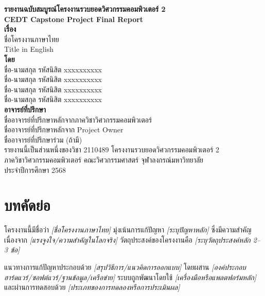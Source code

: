 \documentclass[12pt]{article}
\begin{document}
\begin{center}
    {\Large\bfseries รายงานฉบับสมบูรณ์โครงงานรวบยอดวิศวกรรมคอมพิวเตอร์ 2}\\[0.5pc]
    {\Large\bfseries CEDT Capstone Project Final Report}\\[2pc]
    
    {\large\bfseries เรื่อง}\\[0.5pc]
    {\large ชื่อโครงงานภาษาไทย} \\[0.3pc]
    {\large Title in English} \\[2pc]
    
    {\large\bfseries โดย}\\[0.5pc]
    ชื่อ-นามสกุล รหัสนิสิต xxxxxxxxxx\\
    ชื่อ-นามสกุล รหัสนิสิต xxxxxxxxxx\\
    ชื่อ-นามสกุล รหัสนิสิต xxxxxxxxxx\\
    ชื่อ-นามสกุล รหัสนิสิต xxxxxxxxxx\\[2pc]
    
    {\large\bfseries อาจารย์ที่ปรึกษา}\\[0.5pc]
    ชื่ออาจารย์ที่ปรึกษาหลักจากภาควิชาวิศวกรรมคอมพิวเตอร์\\
    ชื่ออาจารย์ที่ปรึกษาหลักจาก Project Owner\\
    ชื่ออาจารย์ที่ปรึกษาร่วม (ถ้ามี)\\[2pc]
    
    รายงานนี้เป็นส่วนหนึ่งของวิชา 2110489 โครงงานรวบยอดวิศวกรรมคอมพิวเตอร์ 2\\
    ภาควิชาวิศวกรรมคอมพิวเตอร์ คณะวิศวกรรมศาสตร์ จุฬาลงกรณ์มหาวิทยาลัย\\
    ประจำปีการศึกษา 2568
\end{center}

\newpage

\section*{บทคัดย่อ}
โครงงานนี้มีชื่อว่า \textit{[ชื่อโครงงานภาษาไทย]} มุ่งเน้นการแก้ปัญหา \textit{[ระบุปัญหาหลัก]} ซึ่งมีความสำคัญเนื่องจาก \textit{[แรงจูงใจ/ความสำคัญในโลกจริง]} วัตถุประสงค์ของโครงงานคือ \textit{[ระบุวัตถุประสงค์หลัก 2--3 ข้อ]}

แนวทางการแก้ปัญหาประกอบด้วย \textit{[สรุปวิธีการ/แนวคิดการออกแบบ]} โดยผสาน \textit{[องค์ประกอบฮาร์ดแวร์/ซอฟต์แวร์/ฐานข้อมูล/เครือข่าย]} ระบบถูกพัฒนาโดยใช้ \textit{[เครื่องมือหรือแพลตฟอร์มหลัก]} และผ่านการทดสอบด้วย \textit{[ประเภทของการทดลองหรือการประเมินผล]}
\end{document}
